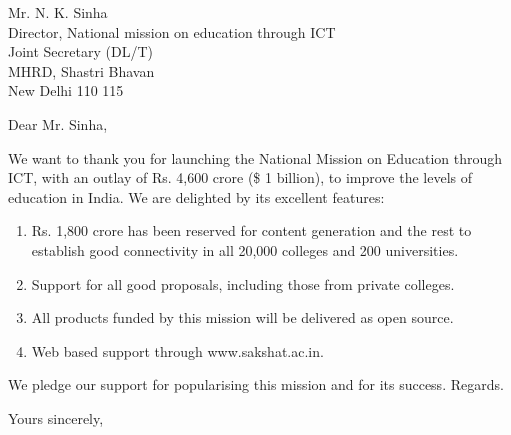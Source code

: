 \documentclass[12pt]{letter}
\date{\today}
\begin{document}
\begin{letter}
{Mr. N. K. Sinha \\
Director, National mission on education through ICT\\
Joint Secretary (DL/T) \\
MHRD, Shastri Bhavan \\
New Delhi 110 115}

\opening{Dear Mr. Sinha,}
We want to thank you for launching the National Mission on
Education through ICT, with an outlay of Rs. 4,600 crore (\$ 1
billion), to improve the levels of education in India.  We are
delighted by its excellent
features:
\begin{enumerate}
\item Rs. 1,800 crore has been reserved for content generation
  and the rest to establish good connectivity in all 20,000
  colleges and 200 universities.
\item Support for all good proposals, including those from
  private colleges.  
\item All products funded by this mission will be delivered
  as open source.
\item Web based support through www.sakshat.ac.in.
\end{enumerate}
We pledge our support for popularising this mission and for its
success.  Regards.
\closing{Yours sincerely,}
\end{letter}
\end{document}
